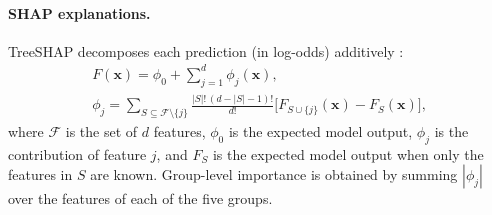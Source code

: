 \paragraph{SHAP explanations.}
TreeSHAP decomposes each prediction (in log-odds) additively \cite{lundberg2017unified,lundberg2020local}:
\begin{equation}
\begin{gathered}
F(\mathbf{x}) = \phi_0 + \sum_{j=1}^{d} \phi_j(\mathbf{x}),\\
\phi_j = \sum_{S \subseteq \mathcal{F}\setminus\{j\}} \frac{|S|!\,(d-|S|-1)!}{d!} \Big[ F_{S\cup\{j\}}(\mathbf{x}) - F_{S}(\mathbf{x}) \Big],
\end{gathered}
\label{eq:shap}
\end{equation}
where $\mathcal{F}$ is the set of $d$ features, $\phi_0$ is the expected model output, $\phi_j$ is the contribution of feature $j$, and $F_S$ is the expected model output when only the features in $S$ are known. Group-level importance is obtained by summing $|\phi_j|$ over the features of each of the five groups.

